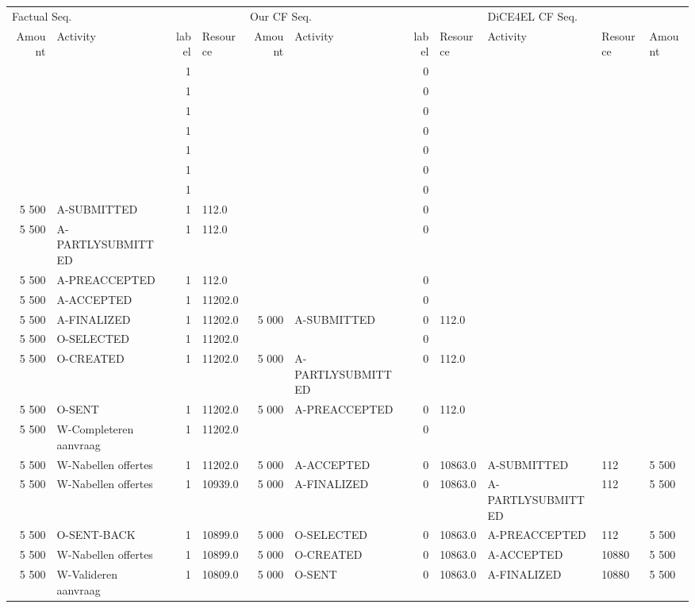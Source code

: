 \begin{tabular}{rlrlrlrllll}
\toprule
\multicolumn{4}{l}{Factual Seq.} & \multicolumn{4}{l}{Our CF Seq.} & \multicolumn{3}{l}{DiCE4EL CF Seq.} \\
Amount & Activity & label & Resource & Amount & Activity & label & Resource & Activity & Resource & Amount \\
\midrule
 &  & 1 &  &  &  & 0 &  &  &  &  \\
 &  & 1 &  &  &  & 0 &  &  &  &  \\
 &  & 1 &  &  &  & 0 &  &  &  &  \\
 &  & 1 &  &  &  & 0 &  &  &  &  \\
 &  & 1 &  &  &  & 0 &  &  &  &  \\
 &  & 1 &  &  &  & 0 &  &  &  &  \\
 &  & 1 &  &  &  & 0 &  &  &  &  \\
5 500 & A-SUBMITTED & 1 & 112.0 &  &  & 0 &  &  &  &  \\
5 500 & A-PARTLYSUBMITTED & 1 & 112.0 &  &  & 0 &  &  &  &  \\
5 500 & A-PREACCEPTED & 1 & 112.0 &  &  & 0 &  &  &  &  \\
5 500 & A-ACCEPTED & 1 & 11202.0 &  &  & 0 &  &  &  &  \\
5 500 & A-FINALIZED & 1 & 11202.0 & 5 000 & A-SUBMITTED & 0 & 112.0 &  &  &  \\
5 500 & O-SELECTED & 1 & 11202.0 &  &  & 0 &  &  &  &  \\
5 500 & O-CREATED & 1 & 11202.0 & 5 000 & A-PARTLYSUBMITTED & 0 & 112.0 &  &  &  \\
5 500 & O-SENT & 1 & 11202.0 & 5 000 & A-PREACCEPTED & 0 & 112.0 &  &  &  \\
5 500 & W-Completeren aanvraag & 1 & 11202.0 &  &  & 0 &  &  &  &  \\
5 500 & W-Nabellen offertes & 1 & 11202.0 & 5 000 & A-ACCEPTED & 0 & 10863.0 & A-SUBMITTED & 112 & 5 500 \\
5 500 & W-Nabellen offertes & 1 & 10939.0 & 5 000 & A-FINALIZED & 0 & 10863.0 & A-PARTLYSUBMITTED & 112 & 5 500 \\
5 500 & O-SENT-BACK & 1 & 10899.0 & 5 000 & O-SELECTED & 0 & 10863.0 & A-PREACCEPTED & 112 & 5 500 \\
5 500 & W-Nabellen offertes & 1 & 10899.0 & 5 000 & O-CREATED & 0 & 10863.0 & A-ACCEPTED & 10880 & 5 500 \\
5 500 & W-Valideren aanvraag & 1 & 10809.0 & 5 000 & O-SENT & 0 & 10863.0 & A-FINALIZED & 10880 & 5 500 \\

\end{tabular}
